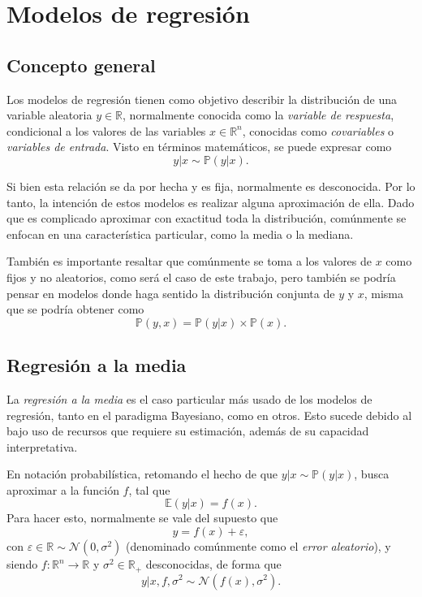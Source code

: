 \chapter[Modelos de regresi\'on]{Modelos de regresi\'on}

\section{Concepto general}

Los modelos de regresi\'on tienen como objetivo describir la distribuci\'on de una variable aleatoria $y \in \mathbb{R}$, normalmente conocida como la \textit{variable de respuesta}, condicional a los valores de las variables $x \in \mathbb{R}^n$, conocidas como \textit{covariables} o \textit{variables de entrada}. Visto en t\'erminos matem\'aticos, se puede expresar como
\begin{equation*}
    y|x \sim \mathbb{P}(y|x).
\end{equation*}

Si bien esta relaci\'on se da por hecha y es fija, normalmente es desconocida. Por lo tanto, la intenci\'on de estos modelos es realizar alguna aproximaci\'on de ella. Dado que es complicado aproximar con exactitud toda la distribuci\'on, com\'unmente se enfocan en una caracter\'istica particular, como la media o la mediana.

Tambi\'en es importante resaltar que com\'unmente se toma a los valores de $x$ como fijos y no aleatorios, como ser\'a el caso de este trabajo, pero tambi\'en se podr\'ia pensar en modelos donde haga sentido la distribuci\'on conjunta de $y$ y $x$, misma que se podr\'ia obtener como
\begin{equation*}
    \mathbb{P}(y,x) = \mathbb{P}(y|x) \times \mathbb{P}(x).
\end{equation*}

\section{Regresión a la media}

La \textit{regresi\'on a la media} es el caso particular m\'as usado de los modelos de regresi\'on, tanto en el paradigma Bayesiano, como en otros. Esto sucede debido al bajo uso de recursos que requiere su estimaci\'on, adem\'as de su capacidad interpretativa.

En notaci\'on probabil\'istica, retomando el hecho de que $y|x \sim \mathbb{P}(y|x)$, busca aproximar a la funci\'on $f$, tal que 
\begin{equation*}
    \mathbb{E}(y|x) = f(x).
\end{equation*}
Para hacer esto, normalmente se vale del supuesto que
\begin{equation*}
    y = f(x) + \varepsilon,
\end{equation*}
con $\varepsilon \in \mathbb{R} \sim \mathcal{N}(0,\sigma^2)$ (denominado com\'unmente como el \textit{error aleatorio}), y siendo $f: \mathbb{R}^n \rightarrow \mathbb{R}$ y $\sigma^2 \in \mathbb{R_+}$ desconocidas, de forma que
\begin{equation*}
    y | x, f, \sigma^2 \sim \mathcal{N}(f(x),\sigma^2).
\end{equation*}

